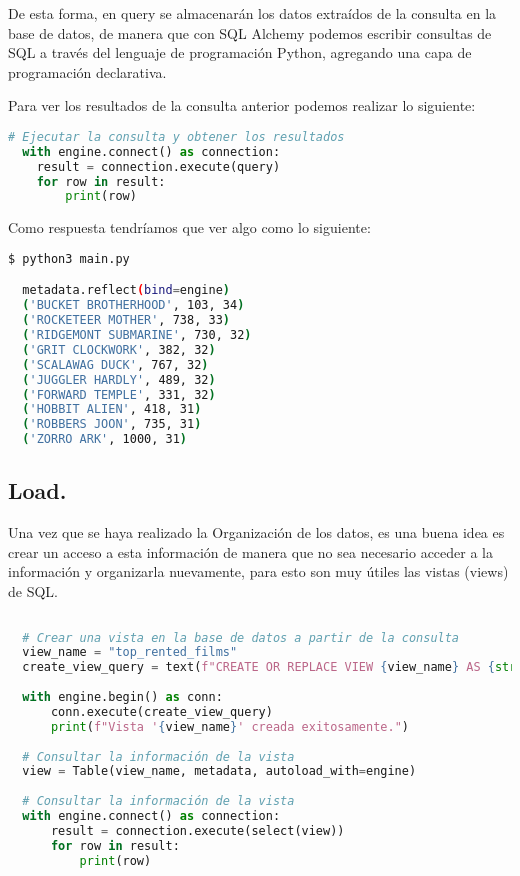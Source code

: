 \documentclass[12pt]{article}
\begin{document}
De esta forma, en query se almacenarán los datos extraídos de la consulta en la base de datos, de manera que con SQL Alchemy podemos escribir consultas de SQL a través del lenguaje de programación Python, agregando una capa de programación declarativa.
\vspace{12pt}

Para ver los resultados de la consulta anterior podemos realizar lo siguiente:

\vspace{12pt}
\begin{lstlisting}[language=Python]
  # Ejecutar la consulta y obtener los resultados
  with engine.connect() as connection:
    result = connection.execute(query)
    for row in result:
        print(row)
\end{lstlisting}
\vspace{12pt}

Como respuesta tendríamos que ver algo como lo siguiente:

\vspace{12pt}
\begin{lstlisting}[language=Bash]
  $ python3 main.py 

  metadata.reflect(bind=engine)
  ('BUCKET BROTHERHOOD', 103, 34)
  ('ROCKETEER MOTHER', 738, 33)
  ('RIDGEMONT SUBMARINE', 730, 32)
  ('GRIT CLOCKWORK', 382, 32)
  ('SCALAWAG DUCK', 767, 32)
  ('JUGGLER HARDLY', 489, 32)
  ('FORWARD TEMPLE', 331, 32)
  ('HOBBIT ALIEN', 418, 31)
  ('ROBBERS JOON', 735, 31)
  ('ZORRO ARK', 1000, 31)
\end{lstlisting}
\vspace{12pt}

\subsection{Load.}

Una vez que se haya realizado la Organización de los datos, es una buena idea es crear un acceso a esta información de manera que no sea necesario acceder a la información y organizarla nuevamente, para esto son muy útiles las vistas (views) de SQL.

\vspace{12pt}
\begin{lstlisting}[language=Python]
    
  # Crear una vista en la base de datos a partir de la consulta
  view_name = "top_rented_films"
  create_view_query = text(f"CREATE OR REPLACE VIEW {view_name} AS {str(query.compile(engine, compile_kwargs={'literal_binds': True}))}")
  
  with engine.begin() as conn:
      conn.execute(create_view_query)
      print(f"Vista '{view_name}' creada exitosamente.")
  
  # Consultar la información de la vista
  view = Table(view_name, metadata, autoload_with=engine)
  
  # Consultar la información de la vista
  with engine.connect() as connection:
      result = connection.execute(select(view))
      for row in result:
          print(row)
    
\end{lstlisting}
\vspace{12pt}
\end{document}
